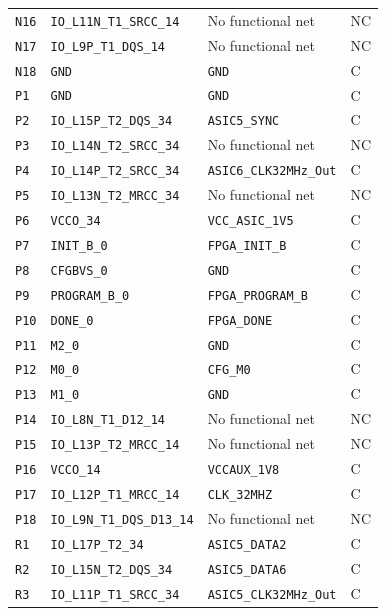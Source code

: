 \documentclass[10pt,a4paper]{article}
\begin{document}
\begin{longtable}{@{}P{15mm}P{42mm}P{92mm}P{10mm}@{}}
\nolinkurl{N16} & \nolinkurl{IO_L11N_T1_SRCC_14} & No functional net & NC \\
\nolinkurl{N17} & \nolinkurl{IO_L9P_T1_DQS_14} & No functional net & NC \\
\nolinkurl{N18} & \nolinkurl{GND} & \nolinkurl{GND} & C \\
\nolinkurl{P1} & \nolinkurl{GND} & \nolinkurl{GND} & C \\
\nolinkurl{P2} & \nolinkurl{IO_L15P_T2_DQS_34} & \nolinkurl{ASIC5_SYNC} & C \\
\nolinkurl{P3} & \nolinkurl{IO_L14N_T2_SRCC_34} & No functional net & NC \\
\nolinkurl{P4} & \nolinkurl{IO_L14P_T2_SRCC_34} & \nolinkurl{ASIC6_CLK32MHz_Out} & C \\
\nolinkurl{P5} & \nolinkurl{IO_L13N_T2_MRCC_34} & No functional net & NC \\
\nolinkurl{P6} & \nolinkurl{VCCO_34} & \nolinkurl{VCC_ASIC_1V5} & C \\
\nolinkurl{P7} & \nolinkurl{INIT_B_0} & \nolinkurl{FPGA_INIT_B} & C \\
\nolinkurl{P8} & \nolinkurl{CFGBVS_0} & \nolinkurl{GND} & C \\
\nolinkurl{P9} & \nolinkurl{PROGRAM_B_0} & \nolinkurl{FPGA_PROGRAM_B} & C \\
\nolinkurl{P10} & \nolinkurl{DONE_0} & \nolinkurl{FPGA_DONE} & C \\
\nolinkurl{P11} & \nolinkurl{M2_0} & \nolinkurl{GND} & C \\
\nolinkurl{P12} & \nolinkurl{M0_0} & \nolinkurl{CFG_M0} & C \\
\nolinkurl{P13} & \nolinkurl{M1_0} & \nolinkurl{GND} & C \\
\nolinkurl{P14} & \nolinkurl{IO_L8N_T1_D12_14} & No functional net & NC \\
\nolinkurl{P15} & \nolinkurl{IO_L13P_T2_MRCC_14} & No functional net & NC \\
\nolinkurl{P16} & \nolinkurl{VCCO_14} & \nolinkurl{VCCAUX_1V8} & C \\
\nolinkurl{P17} & \nolinkurl{IO_L12P_T1_MRCC_14} & \nolinkurl{CLK_32MHZ} & C \\
\nolinkurl{P18} & \nolinkurl{IO_L9N_T1_DQS_D13_14} & No functional net & NC \\
\nolinkurl{R1} & \nolinkurl{IO_L17P_T2_34} & \nolinkurl{ASIC5_DATA2} & C \\
\nolinkurl{R2} & \nolinkurl{IO_L15N_T2_DQS_34} & \nolinkurl{ASIC5_DATA6} & C \\
\nolinkurl{R3} & \nolinkurl{IO_L11P_T1_SRCC_34} & \nolinkurl{ASIC5_CLK32MHz_Out} & C \\

\end{longtable}
\end{document}

